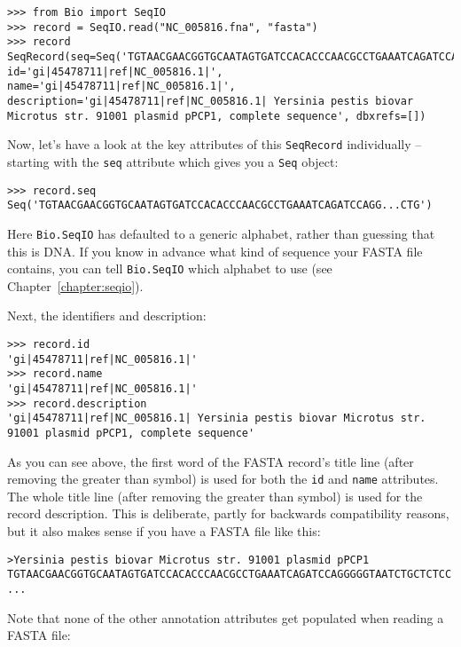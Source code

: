 \begin{verbatim}
>>> from Bio import SeqIO
>>> record = SeqIO.read("NC_005816.fna", "fasta")
>>> record
SeqRecord(seq=Seq('TGTAACGAACGGTGCAATAGTGATCCACACCCAACGCCTGAAATCAGATCCAGG...CTG'), id='gi|45478711|ref|NC_005816.1|', name='gi|45478711|ref|NC_005816.1|', description='gi|45478711|ref|NC_005816.1| Yersinia pestis biovar Microtus str. 91001 plasmid pPCP1, complete sequence', dbxrefs=[])
\end{verbatim}

Now, let's have a look at the key attributes of this \verb|SeqRecord|
individually -- starting with the \verb|seq| attribute which gives you a
\verb|Seq| object:

\begin{verbatim}
>>> record.seq
Seq('TGTAACGAACGGTGCAATAGTGATCCACACCCAACGCCTGAAATCAGATCCAGG...CTG')
\end{verbatim}

\noindent Here \verb|Bio.SeqIO| has defaulted to a generic alphabet, rather
than guessing that this is DNA. If you know in advance what kind of sequence
your FASTA file contains, you can tell \verb|Bio.SeqIO| which alphabet to use
(see Chapter~\ref{chapter:seqio}).

Next, the identifiers and description:

\begin{verbatim}
>>> record.id
'gi|45478711|ref|NC_005816.1|'
>>> record.name
'gi|45478711|ref|NC_005816.1|'
>>> record.description
'gi|45478711|ref|NC_005816.1| Yersinia pestis biovar Microtus str. 91001 plasmid pPCP1, complete sequence'
\end{verbatim}

As you can see above, the first word of the FASTA record's title line (after
removing the greater than symbol) is used for both the \verb|id| and
\verb|name| attributes. The whole title line (after removing the greater than
symbol) is used for the record description. This is deliberate, partly for
backwards compatibility reasons, but it also makes sense if you have a FASTA
file like this:

\begin{verbatim}
>Yersinia pestis biovar Microtus str. 91001 plasmid pPCP1
TGTAACGAACGGTGCAATAGTGATCCACACCCAACGCCTGAAATCAGATCCAGGGGGTAATCTGCTCTCC
...
\end{verbatim}

Note that none of the other annotation attributes get populated when reading a
FASTA file:


